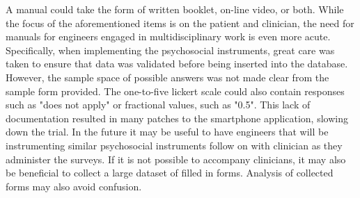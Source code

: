 A manual could take the form of written booklet, on-line video, or both. 
While the focus of the aforementioned items is on the patient and clinician, the need for manuals for engineers engaged in multidisciplinary work is even more acute. Specifically, when implementing the psychosocial instruments, great care was taken to ensure that data was validated before being inserted into the database. However, the sample space of possible answers was not made clear from the sample form provided. The one-to-five lickert scale could also contain responses such as "does not apply" or fractional values, such as "0.5". This lack of documentation resulted in many patches to the smartphone application, slowing down the trial. In the future it may be useful to have engineers that will be instrumenting similar psychosocial instruments follow on with clinician as they administer the surveys. If it is not possible to accompany clinicians, it may also be beneficial to collect a large dataset of filled in forms. Analysis of collected forms may also avoid confusion.





